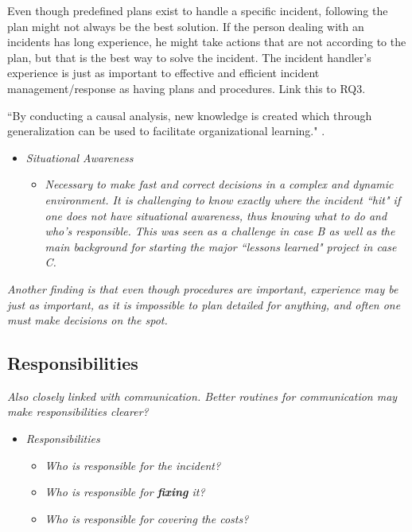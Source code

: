 Even though predefined plans exist to handle a specific incident, following the plan might not always be the best solution. If the person dealing with an incidents has long experience, he might take actions that are not according to the plan, but that is the best way to solve the incident. The incident handler's experience is just as important to effective and efficient incident management/response as having plans and procedures. Link this to RQ3.

``By conducting a causal analysis, new knowledge is created which through generalization can be used to facilitate organizational learning."\cite{werlinger2010preparation}
.

\begin{itemize}
\item \textit{Situational Awareness}
\begin{itemize}
\item\textit{ Necessary to make fast and correct decisions in a complex and dynamic environment. It is challenging to know exactly where the incident ``hit" if one does not have situational awareness, thus knowing what to do and who's responsible. This was  seen as a challenge in case B as well as the main background for starting the major ``lessons learned" project in case C.}
\end{itemize}
\end{itemize}

\textit{Another finding is that even though procedures are important, experience may be just as important, as it is impossible to plan detailed for anything, and often one must make decisions on the spot.}

\subsection{Responsibilities}
\textit{Also closely linked with communication. Better routines for communication may make responsibilities clearer?}

\begin{itemize}
\item \textit{Responsibilities}
\begin{itemize}
\item \textit{Who is responsible for the incident?}
\item \textit{Who is responsible for \textbf{fixing} it?}
\item \textit{Who is responsible for covering the costs?}
\end{itemize}
\end{itemize}

